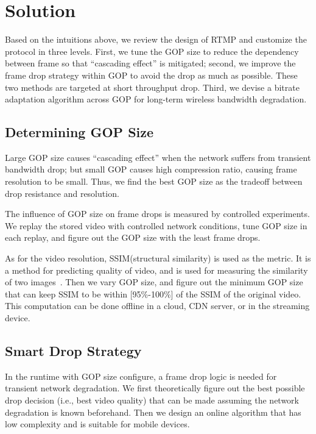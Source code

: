 \newcommand{\Mod}[1]{\text{ (mod } #1\text{)}}
\vspace{-0.18in}  
\section{\name Solution}
\vspace{-0.05in}  
Based on the intuitions above, we review the design of RTMP and customize the protocol in three levels. First, we tune the GOP size to reduce the dependency between frame so that ``cascading effect'' is mitigated; second, we improve the frame drop strategy within GOP to avoid the drop as much as possible. These two methods are targeted at short throughput drop. Third, we devise a bitrate adaptation algorithm across GOP for long-term wireless bandwidth degradation.

\subsection{Determining GOP Size}
Large GOP size causes ``cascading effect'' when the network suffers from transient bandwidth drop; but small GOP causes high compression ratio, causing frame resolution to be small. Thus, we find the best GOP size as the tradeoff between drop resistance and resolution.

The influence of GOP size on frame drops is measured by controlled experiments. We replay the stored video with controlled network conditions, tune GOP size in each replay, and figure out the GOP size with the least frame drops.

As for the video resolution, SSIM(structural similarity) is used as the metric. It is a method for predicting quality of video, and is used for measuring
the similarity of two images~\cite{wang2004image}. Then we vary GOP size, and figure out the minimum GOP size that can keep SSIM to be within [95\%-100\%] of the SSIM of the original video. This computation can be done offline in a cloud, CDN server, or in the streaming device.

\vspace{-0.05in}  
\subsection{Smart Drop Strategy}
\label{subsec:drop-strategy}
In the runtime with GOP size configure, a frame drop logic is needed for transient network degradation. We first theoretically figure out the best possible drop decision (i.e., best video quality) that can be made assuming the network degradation is known beforehand. Then we design an online algorithm that has low complexity and is suitable for mobile devices.

